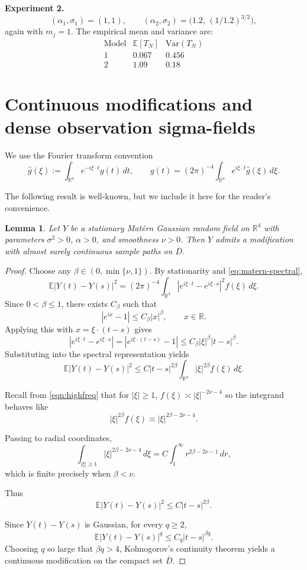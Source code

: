 \documentclass[11pt, reqno]{amsart}
\newtheorem{lemma}{Lemma}
\theoremstyle{remark}
\newcommand{\R}{\mathbb{R}}
\newcommand{\E}{\mathbb{E}}
\newcommand{\1}{\mathbf{1}}
\newcommand{\what}[1]{\widehat{#1}}
\newcommand{\Var}{\mathrm{Var}}
\begin{document}
\medskip

\noindent\textbf{Experiment 2.} 
\[
(\alpha_1,\sigma_1)=(1,1),\qquad 
(\alpha_2,\sigma_2)=\bigl(1.2,\,(1/1.2)^{3/2}\bigr),
\]
again with \(m_j=1\). The empirical mean and variance are:
\[
\begin{array}{c|cc}
\text{Model} & \E[T_N] & \Var(T_N) \\
\hline
1 & 0.067 & 0.456 \\
2 & 1.09 & 0.18
\end{array}
\] 
\section{Continuous modifications and dense observation sigma-fields}

We use the Fourier transform convention
\[
\what{g}(\xi):=\int_{\R^4} e^{-i\xi\cdot t} g(t)\,dt,
\qquad
g(t)=(2\pi)^{-4}\int_{\R^4} e^{i\xi\cdot t}\what g(\xi)\,d\xi.
\]

The following result is well-known, but we include it here for the reader's convenience.

\begin{lemma}\label{lem:continuous-modification}
Let $Y$ be a stationary Mat\'ern Gaussian random field on $\R^4$
with parameters $\sigma^2>0$, $\alpha>0$, and smoothness $\nu>0$.
Then $Y$ admits a modification with almost surely continuous
sample paths on $\overline D$.
\end{lemma}

\begin{proof}
Choose any $\beta\in(0,\min\{\nu,1\})$.
By stationarity and \eqref{eq:matern-spectral},
\[
\E|Y(t)-Y(s)|^2
=(2\pi)^{-4}\int_{\R^4}
|e^{i\xi\cdot t}-e^{i\xi\cdot s}|^2 f(\xi)\,d\xi .
\]
Since $0<\beta\le1$, there exists $C_\beta$ such that
\[
|e^{ix}-1|\le C_\beta |x|^\beta ,
\qquad x\in\R .
\]
Applying this with $x=\xi\cdot(t-s)$ gives
\[
|e^{i\xi\cdot t}-e^{i\xi\cdot s}|
=|e^{i\xi\cdot(t-s)}-1|
\le C_\beta |\xi|^\beta |t-s|^\beta .
\]
Substituting into the spectral representation yields
\[
\E|Y(t)-Y(s)|^2
\le C |t-s|^{2\beta}
\int_{\R^4} |\xi|^{2\beta} f(\xi)\,d\xi .
\]

Recall from \eqref{eqn:highfreq} that for $|\xi|\ge1$,
$
f(\xi)\asymp |\xi|^{-2\nu-4}$
so the integrand behaves like
\[
|\xi|^{2\beta}f(\xi)\asymp |\xi|^{2\beta-2\nu-4}.
\]

Passing to radial coordinates,
\[
\int_{|\xi|\ge1} |\xi|^{2\beta-2\nu-4}\,d\xi
= C\int_1^\infty r^{2\beta-2\nu-1}\,dr,
\]
which is finite precisely when $\beta<\nu$.

\medskip
Thus
\[
\E|Y(t)-Y(s)|^2 \le C|t-s|^{2\beta}.
\]

Since $Y(t)-Y(s)$ is Gaussian, for every $q\ge2$,
\[
\E|Y(t)-Y(s)|^q \le C_q |t-s|^{\beta q}.
\]
Choosing $q$ so large that $\beta q>4$, Kolmogorov's
continuity theorem yields a continuous modification on the compact set
$\overline D$.
\end{proof}
\end{document}
